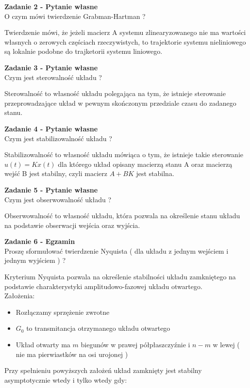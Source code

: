 \documentclass[a4paper,11pt]{article}
\begin{document}
\begin{framed}
\textbf{Zadanie 2 - Pytanie własne } \\ 
O czym mówi twierdzenie Grabman-Hartman ?
\end{framed}
Twierdzenie mówi, że jeżeli macierz A systemu zlinearyzowanego nie ma wartości własnych o zerowych częściach rzeczywistych, to trajektorie systemu nieliniowego są lokalnie podobne do trajketorii systemu liniowego.
\begin{framed}
\textbf{Zadanie 3 - Pytanie własne } \\ 
Czym jest sterowalność układu ?
\end{framed}
Sterowalność to własność układu polegająca na tym, że istnieje sterowanie przeprowadzające układ w pewnym skończonym przedziale czasu do zadanego stanu. 
\begin{framed}
\textbf{Zadanie 4 - Pytanie własne } \\ 
Czym jest stabilizowalność układu ?
\end{framed}
Stabilizowalność to własność układu mówiąca o tym, że istnieje takie sterowanie \( u(t)=Kx(t) \) dla którego układ opisany macierzą stanu A oraz macierzą wejść B jest stabilny, czyli macierz \( A + BK \) jest stabilna. 
\begin{framed}
\textbf{Zadanie 5 - Pytanie własne } \\ 
Czym jest obserwowalność układu ?
\end{framed}
Obserwowalność to własność układu, która pozwala na określenie stanu układu na podstawie obserwacji wejścia oraz wyjścia.
\begin{framed}
\textbf{Zadanie 6 - Egzamin } \\ 
Proszę sformułować twierdzenie Nyquista ( dla układu z jednym wejściem i jednym wyjściem ) ?
\end{framed}
Kryterium Nyquista pozwala na określenie stabilności układu zamkniętego na podstawie charakterystyki amplitudowo-fazowej układu otwartego. \\
Założenia:
\begin{itemize}
\item Rozłączamy sprzężenie zwrotne 
\item \( G_{0} \) to transmitancja otrzymanego układu otwartego
\item Układ otwarty ma \( m \) biegunów w prawej półpłaszczyźnie i \( n-m \) w lewej ( nie ma pierwiastków na osi urojonej )
\end{itemize}
Przy spełnieniu powyższych założeń układ zamknięty jest stabilny  asymptotycznie wtedy i tylko wtedy gdy:
\end{document}
